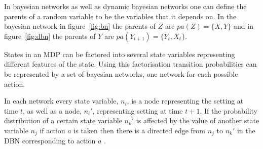 In bayesian networks as well as dynamic bayesian networks one can define the
parents of a random variable to be the variables that it depends on. In the
bayesian network in figure~\ref{fig:bn} the parents of $Z$ are $pa(Z) = \{X,
Y\}$ and in figure~\ref{fig:dbn} the parents of $Y$ are $pa(Y_{t+1}) = \{Y_t,
X_t\}$.

States in an MDP can be factored into several state variables representing
different features of the state. Using this factorisation transition
probabilities can be represented by a set of bayesian networks, one network for
each possible action. 

In each network every state variable, $n_i$, is a node representing the setting
at time $t$, as well as a node, $n_i'$, representing setting at time $t+1$. If
the probability distribution of a certain state variable $n_k'$ is affected by
the value of another state variable $n_j$ if action $a$ is taken then there is
a directed edge from $n_j$ to $n_k'$ in the DBN corresponding to action $a$
\parencite{guestrin2003efficient}.
